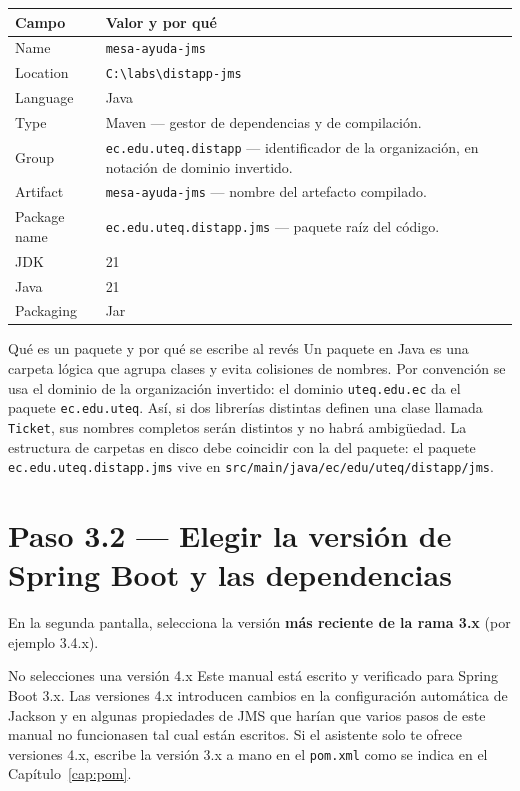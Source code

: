 \documentclass[11pt,a4paper]{book}
\newcommand{\clase}[1]{\texttt{#1}}
\newcommand{\ruta}[1]{\texttt{#1}}
\begin{document}
\begin{center}
	\small
	\begin{tabularx}{\textwidth}{@{}p{4.2cm}X@{}}
		\toprule
		\textbf{Campo} & \textbf{Valor y por qué} \\
		\midrule
		Name             & \texttt{mesa-ayuda-jms} \\
		Location         & \ruta{C:\textbackslash labs\textbackslash distapp-jms} \\
		Language         & Java \\
		Type             & Maven --- gestor de dependencias y de compilación. \\
		Group            & \texttt{ec.edu.uteq.distapp} --- identificador de la organización, en notación de dominio invertido. \\
		Artifact         & \texttt{mesa-ayuda-jms} --- nombre del artefacto compilado. \\
		Package name     & \texttt{ec.edu.uteq.distapp.jms} --- paquete raíz del código. \\
		JDK              & 21 \\
		Java             & 21 \\
		Packaging        & Jar \\
		\bottomrule
	\end{tabularx}
\end{center}

\begin{cajaDef}{Qué es un paquete y por qué se escribe al revés}
	Un paquete en Java es una carpeta lógica que agrupa clases y evita colisiones de nombres.
	Por convención se usa el dominio de la organización invertido: el dominio \texttt{uteq.edu.ec} da el paquete \texttt{ec.edu.uteq}.
	Así, si dos librerías distintas definen una clase llamada \clase{Ticket}, sus nombres completos serán distintos y no habrá ambigüedad.
	La estructura de carpetas en disco debe coincidir con la del paquete: el paquete \texttt{ec.edu.uteq.distapp.jms} vive en \ruta{src/main/java/ec/edu/uteq/distapp/jms}.
\end{cajaDef}

\section{Paso 3.2 --- Elegir la versión de Spring Boot y las dependencias}

En la segunda pantalla, selecciona la versión \textbf{más reciente de la rama 3.x} (por ejemplo 3.4.x).

\begin{cajaAviso}{No selecciones una versión 4.x}
	Este manual está escrito y verificado para Spring Boot 3.x.
	Las versiones 4.x introducen cambios en la configuración automática de Jackson y en algunas propiedades de JMS que harían que varios pasos de este manual no funcionasen tal cual están escritos.
	Si el asistente solo te ofrece versiones 4.x, escribe la versión 3.x a mano en el \ruta{pom.xml} como se indica en el Capítulo~\ref{cap:pom}.
\end{cajaAviso}
\end{document}
